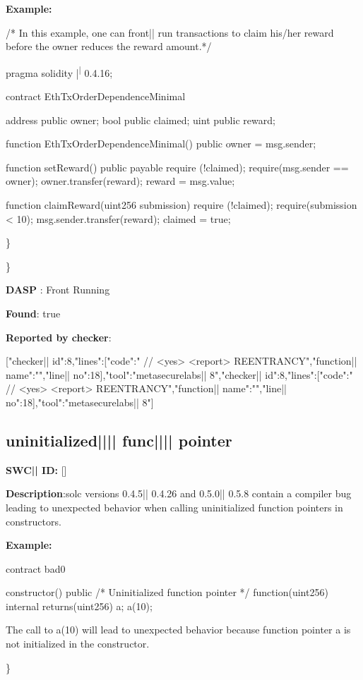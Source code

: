 \documentclass{article}
\begin{document}
\textbf{Example:} 
\begin{ffcode} 

/* In this example, one can front|\textendash| run transactions to claim his/her reward before the owner reduces the reward amount.*/ 

pragma solidity |\textsuperscript| 0.4.16;

contract EthTxOrderDependenceMinimal {
    address public owner;
    bool public claimed;
    uint public reward;

    function EthTxOrderDependenceMinimal() public {
        owner = msg.sender;
    }

    function setReward() public payable {
        require (!claimed);
        require(msg.sender == owner);
        owner.transfer(reward);
        reward = msg.value;
    }

    function claimReward(uint256 submission) {
        require (!claimed);
        require(submission < 10);
        msg.sender.transfer(reward);
        claimed = true;
    }
}

\end{ffcode} 
\} 

\} 

\textbf{DASP} : Front Running

\textbf{Found}: true

\textbf{Reported by checker}: 
\begin{ffcode} 

[{"checker|\textunderscore| id":8,"lines":[{"code":"      // <yes> <report> REENTRANCY\n","function|\textunderscore| name":"","line|\textunderscore| no":18}],"tool":"metasecurelabs|\textendash| 8"},{"checker|\textunderscore| id":8,"lines":[{"code":"      // <yes> <report> REENTRANCY\n","function|\textunderscore| name":"","line|\textunderscore| no":18}],"tool":"metasecurelabs|\textendash| 8"}]
\end{ffcode} 
\subsection{uninitialized{||\textunderscore|| }func{||\textunderscore|| }pointer} 
\textbf{SWC{|\textunderscore| }ID:} []

\textbf{Description}:solc versions 0.4.5|\textendash| 0.4.26 and 0.5.0|\textendash| 0.5.8 contain a compiler bug leading to unexpected behavior when calling uninitialized function pointers in constructors.


\textbf{Example:} 
\begin{ffcode} 

contract bad0 {

  constructor() public {
    /* Uninitialized function pointer */
    function(uint256) internal returns(uint256) a;
    a(10);
  }
}

The call to a(10) will lead to unexpected behavior because function pointer a is not initialized in the constructor.

\end{ffcode} 
\} 
\end{document}
